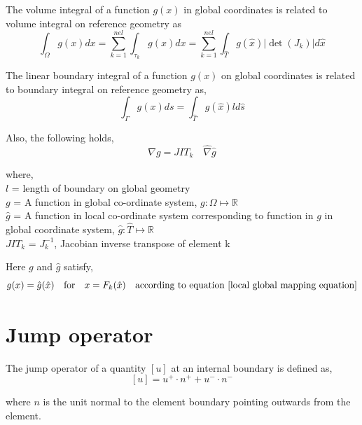 \documentclass[a4paper,12pt]{book}
\begin{document}
The volume integral of a function $g(x)$ in global coordinates is related to volume integral on reference geometry as 
\begin{equation}\label{integral_local_global_volume}
\int_\Omega g(x) dx = \sum_{k=1}^{nel} \int_{\tau_k} g(x) dx = \sum_{k=1}^{nel} \int_{\hat{T}} g(\hat{x}) |\det(J_k)| d \hat{x}
\end{equation}

The linear boundary integral of a function $g(x)$ on global coordinates is related to boundary integral on reference geometry as, 
\begin{equation}\label{integral_local_global_boundary}
\int_{\Gamma} g(x) ds = \int_{\hat{\Gamma}} g(\hat{x}) ld \hat{s}
\end{equation}

Also, the following holds,
\begin{equation}\label{derivative_transformation}
\nabla g = JIT_k \quad \hat{\nabla} \hat{g} 
\end{equation}


where,
\\
$l$ = length of boundary on global geometry\\
$g$  = A function in global co-ordinate system, $g:\Omega \mapsto \mathbb{R}$\\
$\hat{g}$  = A function in local co-ordinate system corresponding to function in $g$ in global coordinate system, $\hat{g}:\hat{T} \mapsto \mathbb{R}$\\
$JIT_k$ = $J_k^{-1}$, Jacobian inverse transpose of element k

Here $g$ and $\hat{g}$ satisfy,
\begin{equation}\label{func_transformation}
g(x) = \hat{g}(\hat{x}) \quad \textrm{for}  \quad x = F_k(\hat{x}) \quad \textrm{according to equation \eqref{local global mapping equation}}
\end{equation}

\section{Jump operator}

The jump operator of a quantity $[u]$ at an internal boundary is defined as,
\begin{equation}\label{jump operator}
[u]=u^+ \cdot n^+ + u^- \cdot n^-
\end{equation}

where $n$ is the unit normal to the element boundary pointing outwards from the element.
\end{document}
